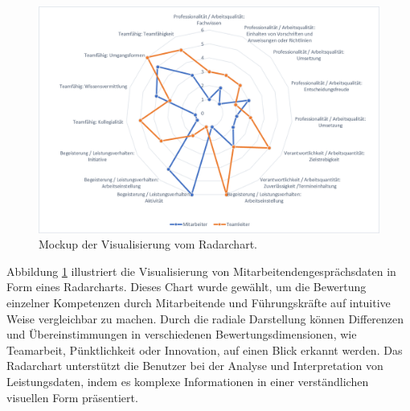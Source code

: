 \begin{figure}[h!]
    \centering
    \includegraphics[width=1.2\textwidth]{images/radarchart.png}
    \caption{Mockup der Visualisierung vom Radarchart.}
    \label{fig:mockup2}
\end{figure}
\noindent
Abbildung \ref{fig:mockup2} illustriert die Visualisierung von Mitarbeitendengesprächsdaten in Form eines Radarcharts. Dieses Chart wurde gewählt, um die Bewertung einzelner Kompetenzen durch Mitarbeitende und Führungskräfte auf intuitive Weise vergleichbar zu machen. Durch die radiale Darstellung können Differenzen und Übereinstimmungen in verschiedenen Bewertungsdimensionen, wie Teamarbeit, Pünktlichkeit oder Innovation, auf einen Blick erkannt werden. Das Radarchart unterstützt die Benutzer bei der Analyse und Interpretation von Leistungsdaten, indem es komplexe Informationen in einer verständlichen visuellen Form präsentiert.

